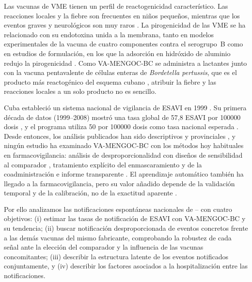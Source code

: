 \documentclass[11pt]{article}
\begin{document}
Las vacunas de VME tienen un perfil de reactogenicidad característico. Las reacciones locales y la
fiebre son frecuentes en niños pequeños, mientras que los eventos graves y neurológicos son muy
raros \cite{Nokleby2007,Holst2009}. La pirogenicidad de las VME se ha relacionado con su endotoxina
unida a la membrana, tanto en modelos experimentales de la vacuna de cuatro componentes contra el
serogrupo~B \cite{Sheerin2019} como en estudios de formulación, en los que la adsorción en hidróxido
de aluminio redujo la pirogenicidad \cite{Rosenqvist1998}. Como VA-MENGOC-BC se administra a
lactantes junto con la vacuna pentavalente de células enteras de \emph{Bordetella pertussis}, que es
el producto más reactogénico del esquema cubano \cite{Galindo2012,CruzRodriguez2021}, atribuir la
fiebre y las reacciones locales a un solo producto no es sencillo.

Cuba estableció un sistema nacional de vigilancia de ESAVI en 1999 \cite{Galindo2012,Reed2007}. Su
primera década de datos (1999--2008) mostró una tasa global de 57,8 ESAVI por \num{100000} dosis
\cite{Galindo2012}, y el programa utiliza 50 por \num{100000} dosis como tasa nacional esperada
\cite{CruzRodriguez2021}. Desde entonces, los análisis publicados han sido descriptivos y
provinciales \cite{CruzRodriguez2021}, y ningún estudio ha examinado VA-MENGOC-BC con los métodos
hoy habituales en farmacovigilancia: análisis de desproporcionalidad con diseños de sensibilidad al
comparador \cite{Evans2001,vanPuijenbroek2002,Bate1998,Noren2013,DuMouchel1999}, tratamiento
explícito del enmascaramiento y de la coadministración \cite{Maignen2014,Salvo2013} e informe
transparente \cite{Fusaroli2024Statement,Fusaroli2024Elaboration}. El aprendizaje automático también
ha llegado a la farmacovigilancia, pero su valor añadido depende de la validación temporal y de la
calibración, no de la exactitud aparente \cite{Salas2022,Collins2024,VanCalster2019}.

Por ello analizamos las notificaciones espontáneas nacionales de \VStudyFirstYear--\VStudyLastYear{}
con cuatro objetivos: (i) estimar las tasas de notificación de ESAVI con VA-MENGOC-BC y su tendencia;
(ii) buscar notificación desproporcionada de eventos concretos frente a las demás vacunas del
mismo fabricante, comprobando la robustez de cada señal ante la elección del comparador y la
influencia de las vacunas concomitantes; (iii) describir la estructura
latente de los eventos notificados conjuntamente, y (iv) describir los factores asociados a la
hospitalización entre las notificaciones.
\end{document}
